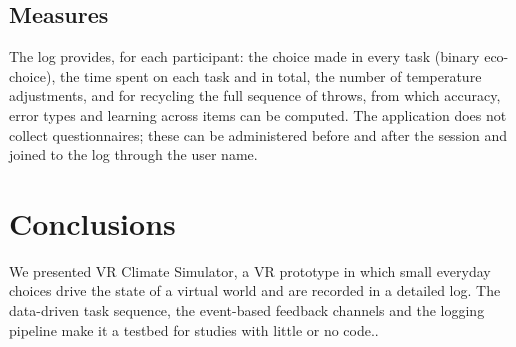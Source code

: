 \documentclass[conference]{IEEEtran}
\begin{document}
\subsection{Measures}
The log provides, for each participant: the choice made in every task
(binary eco-choice), the time spent on each task and in total, the number of
temperature adjustments, and for recycling the full sequence of throws, from
which accuracy, error types and learning across items can be computed. The
application does not collect questionnaires; these can be administered before
and after the session and joined to the log through the user name.

\section{Conclusions}\label{sec:concl}
We presented VR Climate Simulator, a VR prototype in which small everyday
choices drive the state of a virtual world and are recorded in a detailed
log. The data-driven task sequence, the event-based feedback channels and the
logging pipeline make it a testbed for studies with little or no code..
\end{document}
